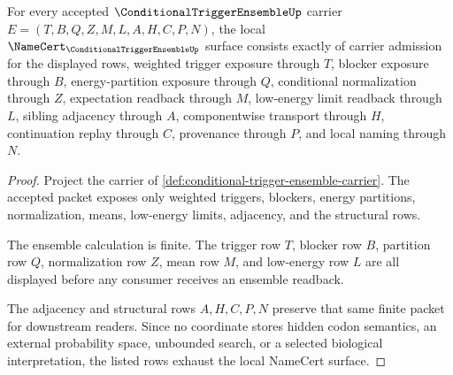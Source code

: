 \begin{theorem}
\label{thm:conditional-trigger-ensemble-namecert-obligations}
For every accepted $\ConditionalTriggerEnsembleUp$ carrier $E=(T,B,Q,Z,M,L,A,H,C,P,N)$, the local $\NameCert_{\ConditionalTriggerEnsembleUp}$ surface consists exactly of carrier admission for the displayed rows, weighted trigger exposure through $T$, blocker exposure through $B$, energy-partition exposure through $Q$, conditional normalization through $Z$, expectation readback through $M$, low-energy limit readback through $L$, sibling adjacency through $A$, componentwise transport through $H$, continuation replay through $C$, provenance through $P$, and local naming through $N$.
\end{theorem}
\begin{proof}
Project the carrier of \autoref{def:conditional-trigger-ensemble-carrier}. The accepted packet exposes only weighted triggers, blockers, energy partitions, normalization, means, low-energy limits, adjacency, and the structural rows.

The ensemble calculation is finite. The trigger row $T$, blocker row $B$, partition row $Q$, normalization row $Z$, mean row $M$, and low-energy row $L$ are all displayed before any consumer receives an ensemble readback.

The adjacency and structural rows $A,H,C,P,N$ preserve that same finite packet for downstream readers. Since no coordinate stores hidden codon semantics, an external probability space, unbounded search, or a selected biological interpretation, the listed rows exhaust the local NameCert surface.
\end{proof}


